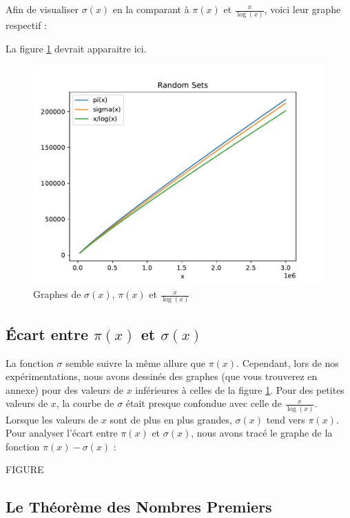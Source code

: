 \documentclass [a4paper, 11pt, twoside] {article}
\begin{document}
Afin de visualiser  $\sigma(x)$ en la comparant à $\pi(x)$ et $\frac{x}{\log(x)}$, voici leur graphe respectif : 

\hspace{1cm}

La figure \ref{im:image1} devrait apparaitre ici.
\begin{figure}[htbp]
	\centerline{\includegraphics[width = \textwidth]{approche_analytique_sets_2.pdf}}
\caption{Graphes de $\sigma(x)$, $\pi(x)$ et $\frac{x}{\log(x)}$ }
	\label{im:image1}
\end{figure}

\subsection{Écart entre $\pi(x)$ et $\sigma(x)$}

La fonction $\sigma$ semble suivre la même allure que $\pi(x)$. Cependant, lors de nos expérimentations, nous avons
dessinés des graphes (que vous trouverez en annexe) pour des valeurs de $x$ inférieures à celles de la figure \ref{im:image1}. Pour des petites valeurs de $x$, la courbe de $\sigma$ était presque confondue avec celle de $\frac{x}{\log(x)}$. Lorsque les valeurs de $x$ sont de plus en plus grandes, $\sigma(x)$ tend vers $\pi(x)$. Pour analyser l'écart entre $\pi(x)$ et $\sigma(x)$, nous avons tracé le graphe de la fonction $\pi(x) - \sigma(x)$ : 

\hspace{1cm}

FIGURE

\subsection{Le Théorème des Nombres Premiers}
\end{document}
